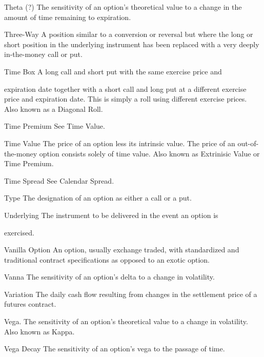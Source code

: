 Theta (?) The sensitivity of an option's theoretical value to a change in the amount of time remaining to expiration.\par
Three-Way A position similar to a conversion or reversal but where the long or short position in the underlying instrument has been replaced with a very deeply in-the-money call or put.\par
Time Box A long call and short put with the same exercise price and\par
expiration date together with a short call and long put at a different exercise price and expiration date. This is simply a roll using different exercise prices. Also known as a Diagonal Roll.\par
Time Premium See Time Value.\par
Time Value The price of an option less its intrinsic value. The price of an out-of-the-money option consists solely of time value. Also known as Extrinisic Value or Time Premium.\par
Time Spread See Calendar Spread.\par
Type The designation of an option as either a call or a put.\par
Underlying The instrument to be delivered in the event an option  is\par
exercised.\par
Vanilla Option An option, usually exchange traded, with standardized and traditional contract specifications as opposed to an exotic option.\par
Vanna The sensitivity of an option's delta to a change in volatility.\par
Variation The daily cash flow resulting from changes in the settlement price of a futures contract.\par
Vega. The sensitivity of an option's theoretical value to a change in volatility. Also known as Kappa.\par
Vega Decay The sensitivity of an option's vega to the passage of time.\par

